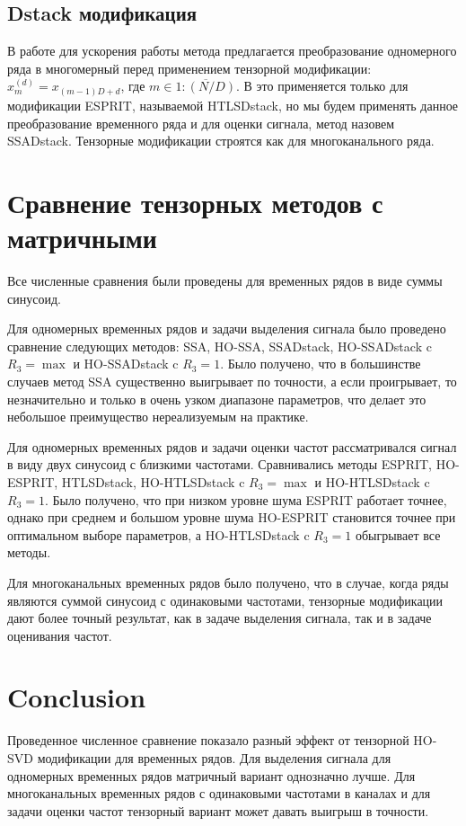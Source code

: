 \documentclass[12pt]{article}
\theoremstyle{definition}
\theoremstyle{remark}
\begin{document}
\subsection{Dstack модификация}
В работе \cite{...} для ускорения работы метода предлагается преобразование одномерного ряда в многомерный перед применением тензорной модификации: $x_m^{(d)} = x_{(m-1)D + d}$, где $m \in \overline{1:(N/D)}$. В \cite{...} это применяется только для модификации ESPRIT, называемой HTLSDstack, но мы будем применять данное преобразование временного ряда и для оценки сигнала, метод назовем SSADstack. Тензорные модификации строятся как для многоканального ряда.

\section{Сравнение тензорных методов с матричными}
Все численные сравнения были проведены для временных рядов в виде суммы синусоид.

Для одномерных временных рядов и задачи выделения сигнала было проведено сравнение следующих методов:
SSA, HO-SSA, SSADstack, HO-SSADstack c $R_3=\max$ и HO-SSADstack c $R_3=1$. Было получено, что в большинстве случаев метод SSA существенно выигрывает по точности, а если проигрывает, то незначительно и только в очень узком диапазоне параметров, что делает это небольшое преимущество нереализуемым на практике. 

Для одномерных временных рядов и задачи оценки частот рассматривался сигнал в виду двух синусоид с близкими частотами. Сравнивались методы ESPRIT, HO-ESPRIT, HTLSDstack, HO-HTLSDstack c $R_3=\max$ и HO-HTLSDstack c $R_3=1$. Было получено, что при низком уровне шума ESPRIT работает точнее, однако при среднем и большом уровне шума HO-ESPRIT становится точнее при оптимальном выборе параметров, а HO-HTLSDstack c $R_3=1$ обыгрывает все методы.

Для многоканальных временных рядов было получено, что в случае, когда ряды являются суммой синусоид с одинаковыми частотами, тензорные модификации дают  более точный результат, как в задаче выделения сигнала, так и в задаче оценивания частот.

\section{Conclusion}
Проведенное численное сравнение показало разный эффект от тензорной HO-SVD модификации для временных рядов.
Для выделения сигнала для одномерных временных рядов матричный вариант однозначно лучше.
Для многоканальных временных рядов с одинаковыми частотами в каналах и для задачи оценки частот тензорный вариант может давать выигрыш в точности.
\end{document}
